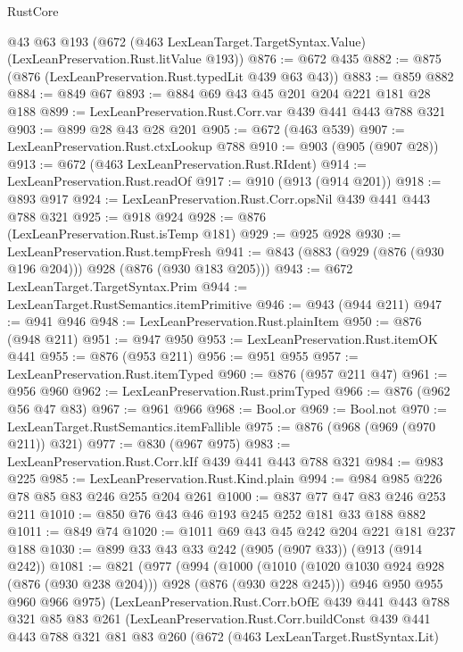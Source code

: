 \begin{lexlean}{RustCore}
\begin{coremodule}
    @43
    @63
    @193
    (@672 (@463 LexLeanTarget.TargetSyntax.Value) (LexLeanPreservation.Rust.litValue @193))
@876 := @672 @435
@882 := @875 (@876 (LexLeanPreservation.Rust.typedLit @439 @63 @43))
@883 := @859 @882
@884 := @849 @67
@893 := @884 @69 @43 @45 @201 @204 @221 @181 @28 @188
@899 := LexLeanPreservation.Rust.Corr.var @439 @441 @443 @788 @321
@903 := @899 @28 @43 @28 @201
@905 := @672 (@463 @539)
@907 := LexLeanPreservation.Rust.ctxLookup @788
@910 := @903 (@905 (@907 @28))
@913 := @672 (@463 LexLeanPreservation.Rust.RIdent)
@914 := LexLeanPreservation.Rust.readOf
@917 := @910 (@913 (@914 @201))
@918 := @893 @917
@924 := LexLeanPreservation.Rust.Corr.opsNil @439 @441 @443 @788 @321
@925 := @918 @924
@928 := @876 (LexLeanPreservation.Rust.isTemp @181)
@929 := @925 @928
@930 := LexLeanPreservation.Rust.tempFresh
@941 := @843 (@883 (@929 (@876 (@930 @196 @204))) @928 (@876 (@930 @183 @205)))
@943 := @672 LexLeanTarget.TargetSyntax.Prim
@944 := LexLeanTarget.RustSemantics.itemPrimitive
@946 := @943 (@944 @211)
@947 := @941 @946
@948 := LexLeanPreservation.Rust.plainItem
@950 := @876 (@948 @211)
@951 := @947 @950
@953 := LexLeanPreservation.Rust.itemOK @441
@955 := @876 (@953 @211)
@956 := @951 @955
@957 := LexLeanPreservation.Rust.itemTyped
@960 := @876 (@957 @211 @47)
@961 := @956 @960
@962 := LexLeanPreservation.Rust.primTyped
@966 := @876 (@962 @56 @47 @83)
@967 := @961 @966
@968 := Bool.or
@969 := Bool.not
@970 := LexLeanTarget.RustSemantics.itemFallible
@975 := @876 (@968 (@969 (@970 @211)) @321)
@977 := @830 (@967 @975)
@983 := LexLeanPreservation.Rust.Corr.kIf @439 @441 @443 @788 @321
@984 := @983 @225
@985 := LexLeanPreservation.Rust.Kind.plain
@994 := @984 @985 @226 @78 @85 @83 @246 @255 @204 @261
@1000 := @837 @77 @47 @83 @246 @253 @211
@1010 := @850 @76 @43 @46 @193 @245 @252 @181 @33 @188 @882
@1011 := @849 @74
@1020 := @1011 @69 @43 @45 @242 @204 @221 @181 @237 @188
@1030 := @899 @33 @43 @33 @242 (@905 (@907 @33)) (@913 (@914 @242))
@1081 := @821
    (@977
      (@994
        (@1000
          (@1010 (@1020 @1030 @924 @928 (@876 (@930 @238 @204))) @928 (@876 (@930 @228 @245)))
          @946
          @950
          @955
          @960
          @966
          @975)
        (LexLeanPreservation.Rust.Corr.bOfE
          @439
          @441
          @443
          @788
          @321
          @85
          @83
          @261
          (LexLeanPreservation.Rust.Corr.buildConst
            @439
            @441
            @443
            @788
            @321
            @81
            @83
            @260
            (@672
              (@463 LexLeanTarget.RustSyntax.Lit)

\end{coremodule}
\end{lexlean}
